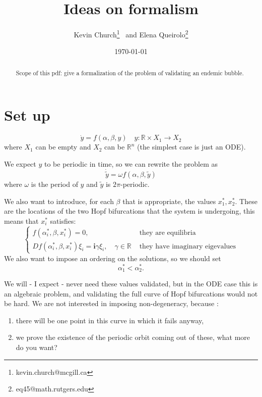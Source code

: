 \documentclass[10pt]{article}
\title{Ideas on formalism}
\author{Kevin Church\thanks{ kevin.church@mcgill.ca}  ~and Elena Queirolo\thanks{eq45@math.rutgers.edu}}
\date{\today}
\newcommand{\imag}{\textbf{i}}
\begin{document}
\maketitle

\begin{abstract}
Scope of this pdf: give a formalization of the problem of validating an endemic bubble.
\end{abstract}

\section{Set up}
$$
\dot y = f(\alpha, \beta, y)\quad y:\mathbb{R}\times X_1 \rightarrow  X_2
$$
where $X_1$ can be empty and $X_2$ can be $\mathbb{R}^n$ (the simplest case is just an ODE). 

We expect $y$ to be periodic in time, so we can rewrite the problem as
$$
\dot{\tilde y }= \omega f(\alpha, \beta,\tilde y)
$$
where $\omega$ is the period of $y$ and $\tilde y $ is $2\pi$-periodic.

We also want to introduce, for each $\beta$ that is appropriate, the values $x^*_1, x^*_2$. These are the locations of the two Hopf bifurcations that the system is undergoing, this means that $x^*_i$ satisfies:
$$
\begin{cases}
f(\alpha^*_i, \beta, x^*_i) = 0 , \quad &\text{ they are equilibria}\\
Df(\alpha^*_i, \beta, x^*_i) \xi_i = \imag \gamma \xi_i, \quad \gamma \in \mathbb{R} &\text{ they have imaginary eigevalues}
\end{cases}
$$
We also want to impose an ordering on the solutions, so we should set
$$
\alpha_1^*<\alpha_2^*.
$$

We will - I expect - never need these values validated, but in the ODE case this is an algebraic problem, and validating the full curve of Hopf bifurcations would not be hard. We are not interested in imposing non-degeneracy, because : 
\begin{enumerate}
\item
there will be one point in this curve in which it fails anyway, 
\item we prove the existence of the periodic orbit coming out of these, what more do you want?
\end{enumerate}
\end{document}
